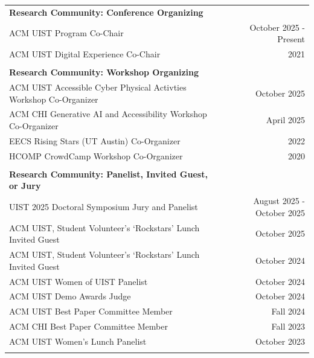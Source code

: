 \begin{longtable}{Xr}
	\textbf{Research Community: Conference Organizing} &  \\
	ACM UIST Program Co-Chair & October 2025 - Present \\
	ACM UIST Digital Experience Co-Chair & 2021 \\
	\\

	\textbf{Research Community: Workshop Organizing} &  \\
	ACM UIST Accessible Cyber Physical Activties Workshop Co-Organizer & October 2025 \\
	ACM CHI Generative AI and Accessibility Workshop Co-Organizer & April 2025 \\
	EECS Rising Stars (UT Austin) Co-Organizer & 2022 \\
	HCOMP CrowdCamp Workshop Co-Organizer & 2020 \\
	\\

	\textbf{Research Community: Panelist, Invited Guest, or Jury} &  \\
	UIST 2025 Doctoral Symposium Jury and Panelist & August 2025 - October 2025 \\
	ACM UIST, Student Volunteer's `Rockstars' Lunch Invited Guest & October 2025 \\
	ACM UIST, Student Volunteer's `Rockstars' Lunch Invited Guest & October 2024 \\
	ACM UIST Women of UIST Panelist & October 2024 \\
	ACM UIST Demo Awards Judge & October 2024 \\
	ACM UIST Best Paper Committee Member & Fall 2024 \\
	ACM CHI Best Paper Committee Member & Fall 2023 \\
	ACM UIST Women's Lunch Panelist & October 2023 \\
	\\


\end{longtable}
